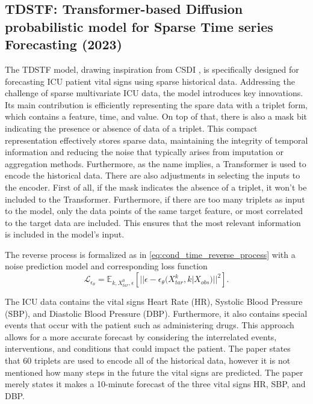 \subsection{TDSTF: Transformer-based Diffusion probabilistic model for Sparse Time series Forecasting (2023) \cite{chang_tdstf_2023}} \label{sec:tdstf}
The TDSTF model, drawing inspiration from CSDI \cite{tashiro_csdi_2021}, is specifically designed for forecasting ICU patient vital signs using sparse historical data. Addressing the challenge of sparse multivariate ICU data, the model introduces key innovations. Its main contribution is efficiently representing the spare data with a triplet form, which contains a feature, time, and value. On top of that, there is also a mask bit indicating the presence or absence of data of a triplet. This compact representation effectively stores sparse data, maintaining the integrity of temporal information and reducing the noise that typically arises from imputation or aggregation methods. Furthermore, as the name implies, a Transformer \cite{vaswani_attention_2017} is used to encode the historical data. 
There are also adjustments in selecting the inputs to the encoder. First of all, if the mask indicates the absence of a triplet, it won't be included to the Transformer. Furthermore, if there are too many triplets as input to the model, only the data points of the same target feature, or most correlated to the target data are included. This ensures that the most relevant information is included in the model's input.

The reverse process is formalized as in \autoref{eq:cond_time_reverse_process} with a noise prediction model and corresponding loss function 
\begin{equation}
    \mathcal{L}_{\epsilon_\theta} = \mathbb{E}_{k, X_{tar}^0, \epsilon} \left[|| \epsilon - \epsilon_\theta(X_{tar}^k, k | X_{obs})||^2 \right].
\end{equation}

The ICU data contains the vital signs Heart Rate (HR), Systolic Blood Pressure (SBP), and Diastolic Blood Pressure (DBP). Furthermore, it also contains special events that occur with the patient such as administering drugs. This approach allows for a more accurate forecast by considering the interrelated events, interventions, and conditions that could impact the patient.
The paper states that 60 triplets are used to encode all of the historical data, however it is not mentioned how many steps in the future the vital signs are predicted. The paper merely states it makes a 10-minute forecast of the three vital signs HR, SBP, and DBP.

